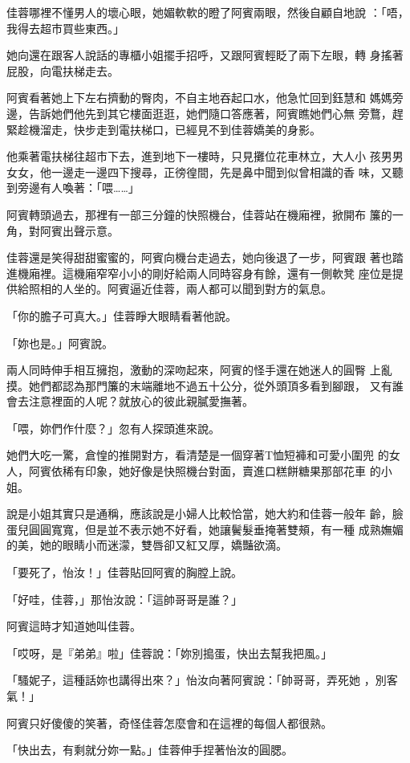 佳蓉哪裡不懂男人的壞心眼，她媚軟軟的瞪了阿賓兩眼，然後自顧自地說
：「唔，我得去超市買些東西。」

她向還在跟客人說話的專櫃小姐擺手招呼，又跟阿賓輕眨了兩下左眼，轉
身搖著屁股，向電扶梯走去。

阿賓看著她上下左右擠動的臀肉，不自主地吞起口水，他急忙回到鈺慧和
媽媽旁邊，告訴她們他先到其它樓面逛逛，她們隨口答應著，阿賓瞧她們心無
旁鶩，趕緊趁機溜走，快步走到電扶梯口，已經見不到佳蓉嬌美的身影。

他乘著電扶梯往超市下去，進到地下一樓時，只見攤位花車林立，大人小
孩男男女女，他一邊走一邊四下搜尋，正徬徨間，先是鼻中聞到似曾相識的香
味，又聽到旁邊有人喚著：「喂……」

阿賓轉頭過去，那裡有一部三分鐘的快照機台，佳蓉站在機廂裡，掀開布
簾的一角，對阿賓出聲示意。

佳蓉還是笑得甜甜蜜蜜的，阿賓向機台走過去，她向後退了一步，阿賓跟
著也踏進機廂裡。這機廂窄窄小小的剛好給兩人同時容身有餘，還有一側軟凳
座位是提供給照相的人坐的。阿賓逼近佳蓉，兩人都可以聞到對方的氣息。

「你的膽子可真大。」佳蓉睜大眼睛看著他說。

「妳也是。」阿賓說。

兩人同時伸手相互擁抱，激動的深吻起來，阿賓的怪手還在她迷人的圓臀
上亂摸。她們都認為那門簾的末端離地不過五十公分，從外頭頂多看到腳跟，
又有誰會去注意裡面的人呢？就放心的彼此親膩愛撫著。

「喂，妳們作什麼？」忽有人探頭進來說。

她們大吃一驚，倉惶的推開對方，看清楚是一個穿著T恤短褲和可愛小圍兜
的女人，阿賓依稀有印象，她好像是快照機台對面，賣進口糕餅糖果那部花車
的小姐。

說是小姐其實只是通稱，應該說是小婦人比較恰當，她大約和佳蓉一般年
齡，臉蛋兒圓圓寬寬，但是並不表示她不好看，她讓鬢髮垂掩著雙頰，有一種
成熟嫵媚的美，她的眼睛小而迷濛，雙唇卻又紅又厚，嬌豔欲滴。

「要死了，怡汝！」佳蓉貼回阿賓的胸膛上說。

「好哇，佳蓉，」那怡汝說：「這帥哥哥是誰？」

阿賓這時才知道她叫佳蓉。

「哎呀，是『弟弟』啦」佳蓉說：「妳別搗蛋，快出去幫我把風。」

「騷妮子，這種話妳也講得出來？」怡汝向著阿賓說：「帥哥哥，弄死她
，別客氣！」

阿賓只好傻傻的笑著，奇怪佳蓉怎麼會和在這裡的每個人都很熟。

「快出去，有剩就分妳一點。」佳蓉伸手捏著怡汝的圓腮。

